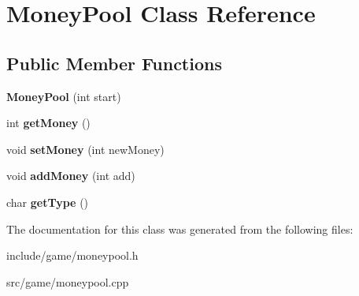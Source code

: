 \hypertarget{classMoneyPool}{\section{Money\-Pool Class Reference}
\label{classMoneyPool}
}
\subsection*{Public Member Functions}
\begin{DoxyCompactItemize}
\item 
\hypertarget{classMoneyPool_a2f2ff4a535e9e001560e8e4809d34c62}{{\bfseries Money\-Pool} (int start)}\label{classMoneyPool_a2f2ff4a535e9e001560e8e4809d34c62}

\item 
\hypertarget{classMoneyPool_af528ae5d1b5421fc034cae3d1be85e2b}{int {\bfseries get\-Money} ()}\label{classMoneyPool_af528ae5d1b5421fc034cae3d1be85e2b}

\item 
\hypertarget{classMoneyPool_ac1c9f57fb867b284ea563980d68b7154}{void {\bfseries set\-Money} (int new\-Money)}\label{classMoneyPool_ac1c9f57fb867b284ea563980d68b7154}

\item 
\hypertarget{classMoneyPool_ae8ee1df13ffdaf9d8cbaa1b3d895633a}{void {\bfseries add\-Money} (int add)}\label{classMoneyPool_ae8ee1df13ffdaf9d8cbaa1b3d895633a}

\item 
\hypertarget{classMoneyPool_ac4dcdfa9ac700accc4d01c66ee44aeec}{char {\bfseries get\-Type} ()}\label{classMoneyPool_ac4dcdfa9ac700accc4d01c66ee44aeec}

\end{DoxyCompactItemize}


The documentation for this class was generated from the following files\-:\begin{DoxyCompactItemize}
\item 
include/game/moneypool.\-h\item 
src/game/moneypool.\-cpp\end{DoxyCompactItemize}
